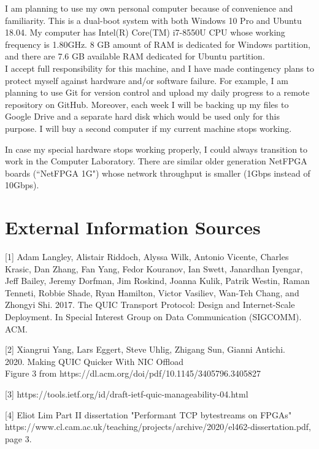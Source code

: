 \documentclass[a4paper,12pt]{article}
\begin{document}
I am planning to use my own personal computer because of convenience and familiarity.
This is a dual-boot system with both Windows 10 Pro and Ubuntu 18.04.
My computer has Intel(R) Core(TM) i7-8550U CPU whose working frequency is 1.80GHz.
8 GB amount of RAM is dedicated for Windows partition, and there are 7.6 GB available RAM dedicated for Ubuntu partition.\\

I accept full responsibility for this machine, and I have made contingency plans to protect myself against hardware and/or software failure.
For example, I am planning to use Git for version control and upload my daily progress to a remote repository on GitHub.
Moreover, each week I will be backing up my files to Google Drive and a separate hard disk which would be used only for this purpose.
I will buy a second computer if my current machine stops working.

In case my special hardware stops working properly, I could always transition to work in the Computer Laboratory.
There are similar older generation NetFPGA boards (``NetFPGA 1G") whose network throughput is smaller (1Gbps instead of 10Gbps).

\section*{External Information Sources}

[1]
Adam Langley, Alistair Riddoch, Alyssa Wilk, Antonio Vicente, Charles Krasic,
Dan Zhang, Fan Yang, Fedor Kouranov, Ian Swett, Janardhan Iyengar, Jeff Bailey,
Jeremy Dorfman, Jim Roskind, Joanna Kulik, Patrik Westin, Raman Tenneti,
Robbie Shade, Ryan Hamilton, Victor Vasiliev, Wan-Teh Chang, and Zhongyi Shi.
2017. The QUIC Transport Protocol: Design and Internet-Scale Deployment. In
Special Interest Group on Data Communication (SIGCOMM). ACM.

[2]
Xiangrui Yang, Lars Eggert, Steve Uhlig, Zhigang Sun, Gianni Antichi.\\
2020. Making QUIC Quicker With NIC Offload\\
Figure 3 from https://dl.acm.org/doi/pdf/10.1145/3405796.3405827

[3]
https://tools.ietf.org/id/draft-ietf-quic-manageability-04.html

[4]
Eliot Lim
Part II dissertation "Performant TCP bytestreams on FPGAs"\\
https://www.cl.cam.ac.uk/teaching/projects/archive/2020/el462-dissertation.pdf, page 3.
\end{document}
